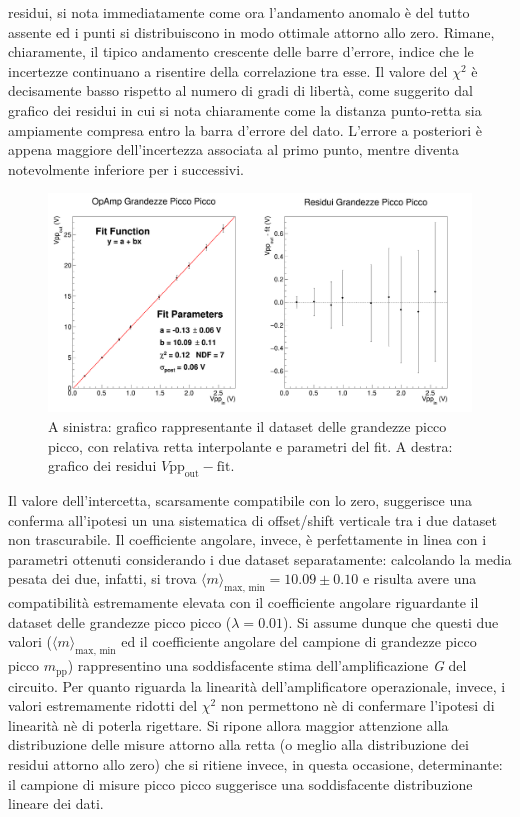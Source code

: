 \documentclass[a4paper,11pt]{article} %
\begin{document}
residui, si nota immediatamente come ora l'andamento anomalo è del tutto assente ed i punti si distribuiscono in modo
ottimale attorno allo zero. Rimane, chiaramente, il tipico andamento crescente delle barre d'errore, indice che le
incertezze continuano a risentire della correlazione tra esse. Il valore del $\chi^2$ è decisamente basso rispetto al
numero di gradi di libertà, come suggerito dal grafico dei residui in cui si nota chiaramente come la distanza
punto-retta sia ampiamente compresa entro la barra d'errore del dato. L'errore a posteriori è appena maggiore
dell'incertezza associata al primo punto, mentre diventa notevolmente inferiore per i successivi.
\begin{figure}[H]
	\centering
	\includegraphics[width=15cm]{../Plots/Report_Plots/opamp_plot_pp_projected.png}
	\caption{\small A sinistra: grafico rappresentante il dataset delle grandezze picco picco, 
	con relativa retta interpolante e parametri del fit. A destra: grafico dei residui $V\text{pp}_{\text{out}}-\text{fit}$.}
	\label{i:opamp_pp}
\end{figure}

\noindent  Il valore dell'intercetta, scarsamente compatibile con lo zero, suggerisce una conferma all'ipotesi un una
sistematica di offset/shift verticale tra i due dataset non trascurabile. Il coefficiente angolare, invece, è
perfettamente in linea con i parametri ottenuti considerando i due dataset separatamente: calcolando la media pesata dei
due, infatti, si trova $\langle m\rangle_{\text{max, min}}=10.09 \pm 0.10$ e risulta avere una compatibilità
estremamente elevata con il coefficiente angolare riguardante il dataset delle grandezze picco picco ($\lambda = 0.01$).
Si assume dunque che questi due valori ($\langle m\rangle_{\text{max, min}}$ ed il coefficiente angolare del campione di
grandezze picco picco $m_{\text{pp}}$) rappresentino una soddisfacente stima dell'amplificazione \textit{G} del
circuito. Per quanto riguarda la linearità dell'amplificatore operazionale, invece, i valori estremamente ridotti del
$\chi^2$ non permettono nè di confermare l'ipotesi di linearità nè di poterla rigettare. Si ripone allora maggior
attenzione alla distribuzione delle misure attorno alla retta (o meglio alla distribuzione dei residui attorno allo
zero) che si ritiene invece, in questa occasione, determinante: il campione di misure picco picco suggerisce una
soddisfacente distribuzione lineare dei dati. 
\end{document}

